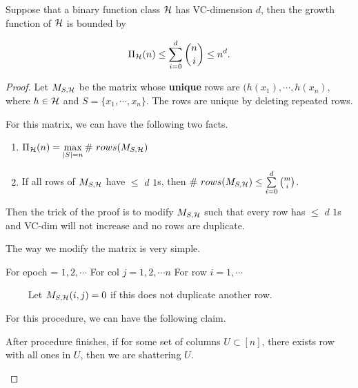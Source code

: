 \documentclass[../main.tex]{subfiles}
\begin{document}
		\begin{theorem}
			Suppose that a binary function class $\mathcal{H}$ has VC-dimension $d$, then the growth function of $\mathcal{H}$ is bounded by
			
			\begin{equation}
			\Pi_{\mathcal{H}}(n) \leq \sum\limits_{i=0}^d \binom{n}{i} \leq n^d.
			\end{equation}
		\end{theorem}
		
		\begin{proof}
		
		Let $M_{S,\mathcal{H}}$ be the matrix whose \textbf{unique} rows are $(h(x_1),\cdots, h(x_n)$, where $h\in \mathcal{H}$ and $S = \{x_1,\cdots ,x_n\}$. The rows are unique by deleting repeated rows.
		
		For this matrix, we can have the following two facts.
		
		\begin{fact}
		
		\begin{enumerate}
		\item $\Pi_{\mathcal{H}}(n) = \max\limits_{|S| = n} \#\ rows(M_{S,\mathcal{H}})$
		
		\item If all rows of $M_{S,\mathcal{H}}$ have $\leq$ $d$ $1$s, then $\#\ rows(M_{S,\mathcal{H}})\leq \sum\limits_{i=0}^d \binom{m}{i}$.

		\end{enumerate}
		\end{fact}
		Then the trick of the proof is to modify $M_{S,\mathcal{H}}$ such that every row has $\leq$ $d$ $1$s and VC-dim will not increase and no rows are duplicate.
		
		The way we modify the matrix is very simple.
		
		\begin{algorithm}[]
			\begin{algorithmic}
			\STATE For epoch = $1, 2,\cdots $
			\bindent
			\STATE For col $ j = 1, 2,\cdots n$
			\bindentt
			\STATE For row $i = 1,\cdots$
			
			\STATE $\qquad$ Let $M_{S,\mathcal{H}}(i,j) = 0$ if this does not duplicate another row.
			\eindentt
			\eindent
			\end{algorithmic}
		\end{algorithm}


		For this procedure, we can have the following claim.
		
		\begin{claim}
			After procedure finishes, if for some set of columns $U \subset [n]$, there exists row with all ones in $U$, then we are shattering $U$.
		\end{claim}
		

\end{proof}
\end{document}
